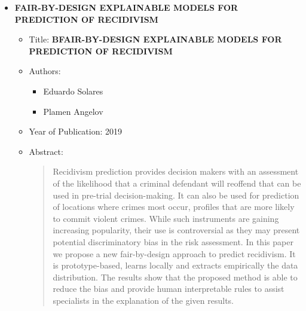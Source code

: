 \documentclass{article}
\begin{document}
\begin{itemize}
\begin{itemize}
\begin{abstract}
            \end{abstract}
        
        \end{itemize}
        
        \item \textbf{FAIR-BY-DESIGN EXPLAINABLE MODELS FOR PREDICTION OF
        RECIDIVISM}
        
        \begin{itemize}
        
            \item Title: \textbf{BFAIR-BY-DESIGN EXPLAINABLE MODELS FOR PREDICTION OF
            RECIDIVISM}
        
            \item Authors:
        
            \begin{itemize}
        
                \item Eduardo Solares
        
                \item Plamen Angelov
        
            \end{itemize}
        
            \item Year of Publication: 2019
        
            \item Abstract:
        
            \begin{abstract}
        
                Recidivism prediction provides decision makers with an assessment of the likelihood that a criminal
                defendant will reoffend that can be used in pre-trial decision-making. It can also be used for prediction
                of locations where crimes most occur, profiles that are more likely to commit violent crimes. While
                such instruments are gaining increasing popularity, their use is controversial as they may present
                potential discriminatory bias in the risk assessment. In this paper we propose a new fair-by-design
                approach to predict recidivism. It is prototype-based, learns locally and extracts empirically the data
                distribution. The results show that the proposed method is able to reduce the bias and provide human
                interpretable rules to assist specialists in the explanation of the given results.
        

\end{abstract}
\end{itemize}
\end{itemize}
\end{document}
